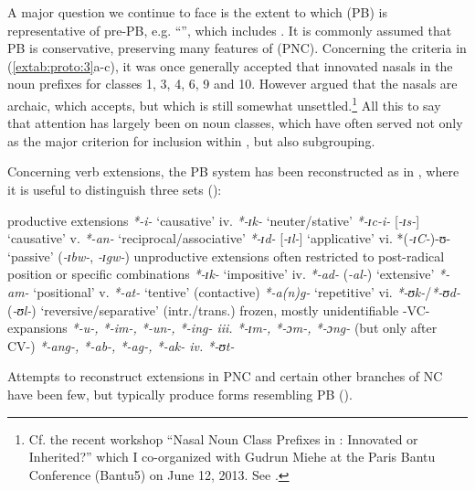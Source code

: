 \documentclass[output=paper]{langsci/langscibook}
\begin{document}
A major question we continue to face is the extent to which  (PB) is representative of pre-PB, e.g. “”, which includes . It is commonly assumed that PB is conservative, preserving many features of  (PNC). Concerning the criteria in (\ref{extab:proto:3}a-c), it was once generally accepted that  innovated nasals in the noun prefixes for classes 1, 3, 4, 6, 9 and 10. However \citet{Miehe1991} argued that the nasals are archaic, which \citet[43-44]{Williamson1993} accepts, but which is still somewhat unsettled.\footnote{Cf. the recent workshop “Nasal Noun Class Prefixes in : Innovated or Inherited?” which I co-organized with Gudrun Miehe at the Paris Bantu Conference (Bantu5) on June 12, 2013. See .} All this to say that attention has largely been on noun classes, which have often served not only as the major criterion for inclusion within , but also subgrouping.

Concerning verb extensions, the PB system has been reconstructed as in , where it is useful to distinguish three sets (\citealt{Meeussen1967,Schadeberg2003}):

\ea%
    \label{ex:proto:4}
    \ea productive extensions
      \ea  \textit{*-i-}  ‘causative’  iv.  \textit{*-ɪk-}  ‘neuter/stative’
      \ex  \textit{*-ɪc-i- } [\textit{-ɪs-}]  ‘causative’  v.  \textit{*-an-}  ‘reciprocal/associative’
      \ex  \textit{*-ɪd-}  [\textit{-ɪl-}]  ‘applicative’  vi.  *(\textit{-ɪC-})-ʊ-  ‘passive’ (\textit{-ɪbw-}, \textit{-ɪgw-})
    \z
    \ex  unproductive extensions often restricted to post-radical position or specific combinations
      \ea  \textit{*-ɪk-}  ‘impositive’  iv.  \textit{*-ad-} (\textit{-al-})  ‘extensive’
      \ex  \textit{*-am-}  ‘positional’  v.  \textit{*-at-}  ‘tentive’ (contactive)
      \ex  \textit{*-a(n)g-}  ‘repetitive’  vi.  \textit{*-ʊk-}/\textit{*-ʊd-} (\textit{-ʊl-})  ‘reversive/separative’ (intr./trans.)
    \z
    \ex  frozen, mostly unidentifiable -VC- expansions
      \ea  \textit{*-u-, *-im-, *-un-, *-ing-  iii.  *-ɪm-, *-ɔm-, *-ɔng-}  (but only after CV-)
      \ex  \textit{*-ang-, *-ab-, *-ag-, *-ak-  iv.  *-ʊt-}
    \z
  \z
\z

Attempts to reconstruct extensions in PNC and certain other branches of NC have been few, but typically produce forms resembling PB ().
\end{document}
